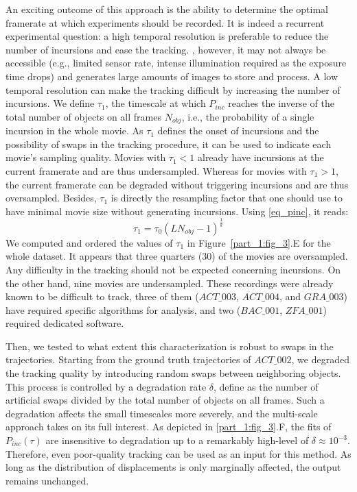     An exciting outcome of this approach is the ability to determine the optimal framerate at which experiments should be recorded. It is indeed a recurrent experimental question: a high temporal resolution is preferable to reduce the number of incursions and ease the tracking. , however, it may not always be accessible (e.g., limited sensor rate, intense illumination required as the exposure time drops) and generates large amounts of images to store and process. A low temporal resolution can make the tracking difficult by increasing the number of incursions.
    We define $\tau_1$, the timescale at which $P_{inc}$ reaches the inverse of the total number of objects on all frames $N_{obj}$, i.e., the probability of a single incursion in the whole movie. As $\tau_1$ defines the onset of incursions and the possibility of swaps in the tracking procedure, it can be used to indicate each movie's sampling quality. Movies with $\tau_1<1$ already have incursions at the current framerate and are thus undersampled. Whereas for movies with $\tau_1>1$, the current framerate can be degraded without triggering incursions and are thus oversampled. Besides, $\tau_1$ is directly the resampling factor that one should use to have minimal movie size without generating incursions. Using \ref{eq_pinc}, it reads:
    \begin{equation}
        \tau_1=\tau_0(LN_{obj}-1)^{\frac{1}{k}}
    \end{equation}
    We computed and ordered the values of $\tau_1$ in Figure~\ref{part_1:fig_3}.E for the whole dataset. It appears that three quarters (30) of the movies are oversampled. Any difficulty in the tracking should not be expected concerning incursions. On the other hand, nine movies are undersampled. These recordings were already known to be difficult to track, three of them ($ACT\_003$, $ACT\_004$, and $GRA\_003$) have required specific algorithms for analysis, and two ($BAC\_001$, $ZFA\_001$) required dedicated software.

    Then, we tested to what extent this characterization is robust to swaps in the trajectories. Starting from the ground truth trajectories of $ACT\_002$, we degraded the tracking quality by introducing random swaps between neighboring objects. This process is controlled by a degradation rate $\delta$, define as the number of artificial swaps divided by the total number of objects on all frames. Such a degradation affects the small timescales more severely, and the multi-scale approach takes on its full interest. As depicted in \ref{part_1:fig_3}.F, the fits of $P_{inc}(\tau)$ are insensitive to degradation up to a remarkably high-level of $\delta \approx 10^{-3}$. Therefore, even poor-quality tracking can be used as an input for this method. As long as the distribution of displacements is only marginally affected, the output remains unchanged.


